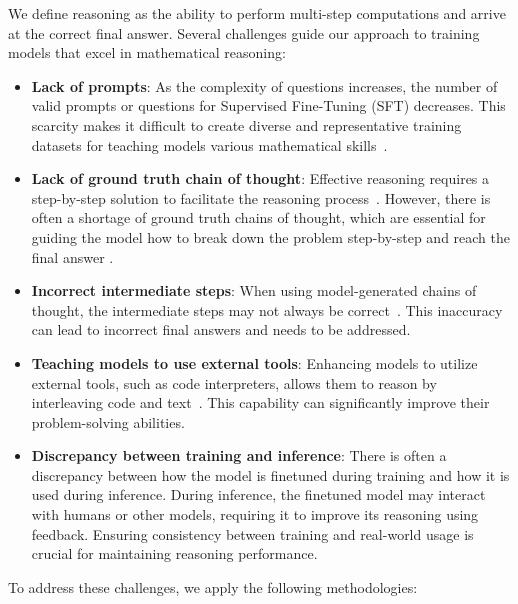 \documentclass[dvipsnames]{fairmeta}
\begin{document}
We define reasoning as the ability to perform multi-step computations and arrive at the correct final answer. Several challenges guide our approach to training models that excel in mathematical reasoning:

\begin{itemize}
    \item \textbf{Lack of prompts}: As the complexity of questions increases, the number of valid prompts or questions for Supervised Fine-Tuning (SFT) decreases. This scarcity makes it difficult to create diverse and representative training datasets for teaching models various mathematical skills~\citep{yu2023metamath, yue2023mammoth, luo2023wizardmath, mitra2024orca, shao2024deepseekmath,yue2024mammoth2}.
    \item \textbf{Lack of ground truth chain of thought}: Effective reasoning requires a step-by-step solution to facilitate the reasoning process~\citep{wei2022chain}. However, there is often a shortage of ground truth chains of thought, which are essential for guiding the model how to break down the problem step-by-step and reach the final answer \citep{zelikman2022star}.
    \item \textbf{Incorrect intermediate steps}: When using model-generated chains of thought, the intermediate steps may not always be correct~\citep{cobbe2021training,uesato2022solving, lightman2023let, wang2023math}. This inaccuracy can lead to incorrect final answers and needs to be addressed.
    \item \textbf{Teaching models to use external tools}: Enhancing models to utilize external tools, such as code interpreters, allows them to reason by interleaving code and text~\citep{gao2023pal, chen2022program, gou2023tora}. This capability can significantly improve their problem-solving abilities.
    \item \textbf{Discrepancy between training and inference}: There is often a discrepancy between how the model is finetuned during training and how it is used during inference. During inference, the finetuned model may interact with humans or other models, requiring it to improve its reasoning using feedback. Ensuring consistency between training and real-world usage is crucial for maintaining reasoning performance.
\end{itemize}

To address these challenges, we apply the following methodologies:
\end{document}
